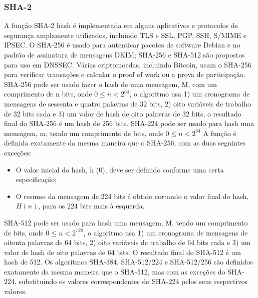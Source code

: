 \documentclass[conference]{IEEEtran}
\begin{document}
\subsubsection{SHA-2}

A função SHA-2 hash é implementada em alguns aplicativos e protocolos de segurança amplamente utilizados, 
incluindo TLS e SSL, PGP, SSH, S/MIME e IPSEC.
O SHA-256 é usado para autenticar pacotes de software Debian e no padrão de assinatura de 
mensagens DKIM; SHA-256 e SHA-512 são propostos para uso em DNSSEC. \cite{rfc5702}
Várias criptomoedas, incluindo Bitcoin, usam o SHA-256 para verificar transações e calcular o proof of work ou a 
prova de participação. \cite{sha256Bitcoin}
SHA-256 pode ser usado fazer o hash de uma mensagem, M, com um comprimento de n bits, onde $0 \leq n < 2^{64}$, 
o algoritmo usa 1) um cronograma de mensagens de sessenta e quatro palavras de 32 bits, 
2) oito variáveis de trabalho de 32 bits cada e 3) um valor de hash de oito palavras de 32 bits, 
o resultado final do SHA-256 é um hash de 256 bits.
SHA-224 pode ser usado para hash uma mensagem, m, tendo um comprimento de bits, onde $0 \leq n < 2^{64}$
A função é definida exatamente da mesma maneira que o SHA-256, com as duas seguintes exceções:
\begin{itemize}
\item O valor inicial do hash, h (0), deve ser definido conforme uma certa especificação;
\item O resumo da mensagem de 224 bits é obtido cortando o valor final do hash, $H(n)$, para os 224 
bits mais à esquerda.
\end{itemize}
SHA-512 pode ser usado para hash uma mensagem, M, tendo um comprimento de bits, onde $0 \leq n < 2^{128}$, 
o algoritmo usa 1) um cronograma de mensagens de oitenta palavras de 64 bits, 2) oito variáveis 
de trabalho de 64 bits cada e 3) um valor de hash de oito palavras de 64 bits. 
O resultado final do SHA-512 é um hash de 512.
Os algoritmos SHA-384, SHA-512/224 e SHA-512/256 são definidos exatamente da mesma maneira que o SHA-512, 
mas com as exceções do SHA-224, substituindo os valores correspondentes do SHA-224 pelos seus respectivos valores. \cite{SHS2015}
\end{document}
